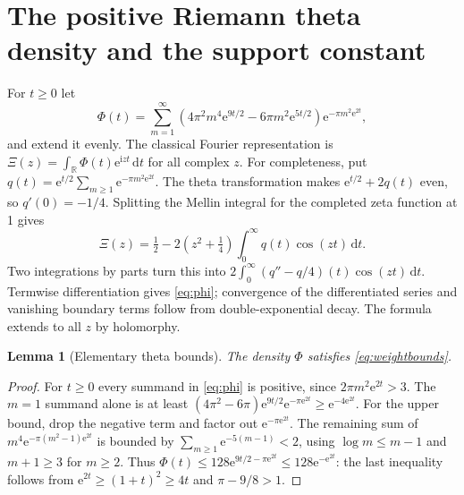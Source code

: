 \documentclass[11pt]{article}
\newtheorem{lemma}[theorem]{Lemma}
\theoremstyle{remark}\newtheorem{remark}[theorem]{Remark}
\newcommand{\R}{\mathbb R}\newcommand{\C}{\mathbb C}\newcommand{\e}{\mathrm e}\newcommand{\ii}{\mathrm i}\newcommand{\dd}{\,\mathrm d}\newcommand{\abs}[1]{\left|#1\right|}\newcommand{\norm}[1]{\left\|#1\right\|}\newcommand{\ord}{\operatorname{ord}}\newcommand{\re}{\operatorname{Re}}\newcommand{\im}{\operatorname{Im}}\newcommand{\supp}{\operatorname{supp}}
\begin{document}
\section{The positive Riemann theta density and the support constant}
\label{sec:xi}
For $t\ge0$ let
\begin{equation}\label{eq:phi}
\Phi(t)=\sum_{m=1}^\infty\left(4\pi^2 m^4\e^{9t/2}-6\pi m^2\e^{5t/2}\right)\e^{-\pi m^2\e^{2t}},
\end{equation}
and extend it evenly. The classical Fourier representation \cite[\S2.16]{titchmarsh} is $\Xi(z)=\int_\R\Phi(t)\e^{\ii zt}\dd t$ for all complex $z$. For completeness, put $q(t)=\e^{t/2}\sum_{m\ge1}\e^{-\pi m^2\e^{2t}}$. The theta transformation makes $\e^{t/2}+2q(t)$ even, so $q'(0)=-1/4$. Splitting the Mellin integral for the completed zeta function at 1 gives
\[
\Xi(z)=\tfrac12-2(z^2+\tfrac14)\int_0^\infty q(t)\cos(zt)\dd t.
\]
Two integrations by parts turn this into $2\int_0^\infty(q''-q/4)(t)\cos(zt)\dd t$. Termwise differentiation gives \eqref{eq:phi}; convergence of the differentiated series and vanishing boundary terms follow from double-exponential decay. The formula extends to all $z$ by holomorphy.

\begin{lemma}[Elementary theta bounds]\label{lem:theta}
The density $\Phi$ satisfies \eqref{eq:weightbounds}.
\end{lemma}
\begin{proof}
For $t\ge0$ every summand in \eqref{eq:phi} is positive, since $2\pi m^2\e^{2t}>3$. The $m=1$ summand alone is at least $(4\pi^2-6\pi)\e^{9t/2}\e^{-\pi\e^{2t}}\ge \e^{-4\e^{2t}}$. For the upper bound, drop the negative term and factor out $\e^{-\pi\e^{2t}}$. The remaining sum of $m^4\e^{-\pi(m^2-1)\e^{2t}}$ is bounded by $\sum_{m\ge1}\e^{-5(m-1)}<2$, using $\log m\le m-1$ and $m+1\ge3$ for $m\ge2$. Thus $\Phi(t)\le128\e^{9t/2-\pi\e^{2t}}\le128\e^{-\e^{2t}}$: the last inequality follows from $\e^{2t}\ge(1+t)^2\ge4t$ and $\pi-9/8>1$.
\end{proof}
\end{document}
